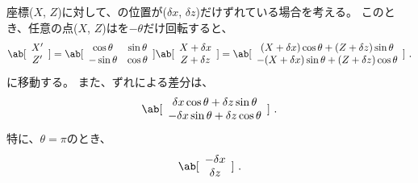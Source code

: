 




\TableCenter 座標($X$, $Z$)に対して、\JigCenter の位置が($\delta x$, $\delta z$)だけずれている場合を考える。
このとき、任意の点($X$, $Z$)は\Table を$-\theta$だけ回転すると、
\begin{align*}
  \ab[
    \begin{array}{c}
      X'\\
      Z'
    \end{array}
  ]
  = \ab[
    \begin{array}{cc}
      \cos\theta & \sin\theta\\
      -\sin\theta & \cos\theta
    \end{array}
  ]
  \ab[
    \begin{array}{c}
      X+\delta x\\
      Z+\delta z
    \end{array}
  ]
  = \ab[
    \begin{array}{c}
      (X+\delta x)\cos\theta+(Z+\delta z)\sin\theta\\
      -(X+\delta x)\sin\theta+(Z+\delta z)\cos\theta
    \end{array}
  ]\ .
\end{align*}
に移動する。
また、ずれによる差分は、
\begin{align*}
  \ab[
    \begin{array}{c}
      \delta x\cos\theta+\delta z\sin\theta\\
      -\delta x\sin\theta+\delta z\cos\theta
    \end{array}
  ]\ .
\end{align*}
特に、$\theta = \pi$のとき、
\begin{align*}
  \ab[
    \begin{array}{c}
      -\delta x\\
      \delta z
    \end{array}
  ]\ .
\end{align*}


